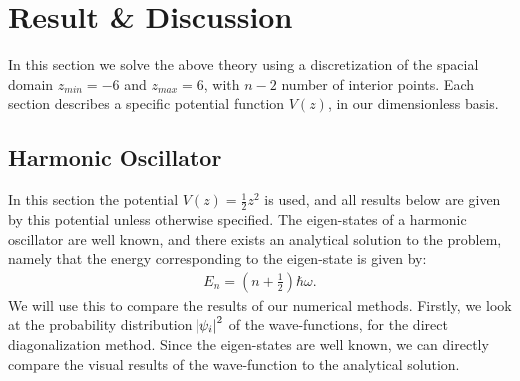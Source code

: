 \documentclass[a4paper]{article}
\newcommand{\w}{\omega}
\begin{document}
\newpage
\section{Result \& Discussion}
In this section we solve the above theory using a discretization of the spacial domain $z_{min}= -6$ and $z_{max} = 6$, with $n - 2$ number of interior points. 
Each section describes a specific potential function $V(z)$, in our dimensionless basis.

\subsection{Harmonic Oscillator}
In this section the potential $V(z) = \frac{1}{2}z^2$ is used, and all results below are given by this potential unless otherwise specified.
The eigen-states of a harmonic oscillator are well known, and there exists an analytical solution to the problem, namely that the energy corresponding to the eigen-state is given by:
\begin{align*}
    E_n = \left(n + \frac{1}{2}\right)\hbar\w.
\end{align*}We will use this to compare the results of our numerical methods. Firstly, we look at the probability distribution $\abs{\psi_i}^2$ of the wave-functions, for the direct diagonalization method.
Since the eigen-states are well known, we can directly compare the visual results of the wave-function to the analytical solution.
\end{document}

